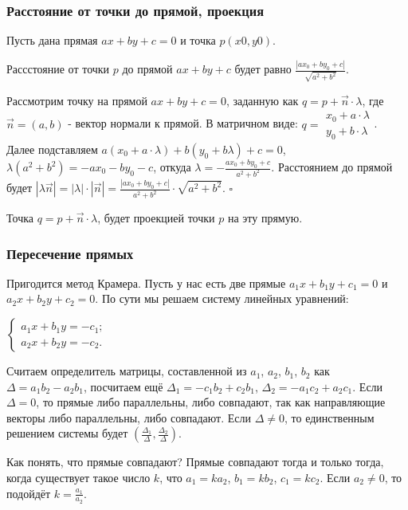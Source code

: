 
\subsubsection*{Расстояние от точки до прямой, проекция}

Пусть дана прямая $ax + by + c = 0$ и точка $p (x0, y0)$.

\Statement Рассстояние от точки $p$ до прямой $ax + by + c$ будет равно $\frac{|ax_0 + by_0 + c|}{\sqrt{a^2 + b^2}}$.

\Proof Рассмотрим точку на прямой $ax + by + c = 0$, заданную как $q = p + \vec{n} \cdot \lambda$, где $\vec{n} = (a, b)$ - вектор нормали к прямой.  В матричном виде: $q = \begin{matrix} x_0 + a \cdot \lambda \\ y_0 + b \cdot \lambda \end{matrix}$. Далее подставляем $a (x_0 + a \cdot \lambda) + b (y_0 + b \lambda) + c = 0$, $\lambda (a^2 + b^2) = -ax_0 - by_0 - c$, откуда $\lambda = - \frac{ax_0 + by_0 + c}{a^2 + b^2}$. Расстоянием до прямой будет $|\lambda \vec{n}| = |\lambda| \cdot |\vec{n}| = \frac{|ax_0 + by_0 + c|}{a^2 + b^2} \cdot \sqrt{a^2 + b^2}$. $\square$

Точка $q = p + \vec{n} \cdot \lambda$, будет проекцией точки $p$ на эту прямую.

\subsubsection*{Пересечение прямых}

Пригодится метод Крамера. Пусть у нас есть две прямые $a_1 x + b_1 y + c_1 = 0$ и $a_2 x + b_2 y + c_2 = 0$. По сути мы решаем систему линейных уравнений:

\begin{center}
    $\begin{cases}
    a_1 x + b_1 y = -c_1; \\
    a_2 x + b_2 y = -c_2.
    \end{cases}$
\end{center}

Считаем определитель матрицы, составленной из $a_1$, $a_2$, $b_1$, $b_2$ как $\Delta = a_1 b_2 - a_2 b_1$, посчитаем ещё $\Delta_1 = -c_1 b_2 + c_2 b_1$, $\Delta_2 = -a_1 c_2 + a_2 c_1$. Если $\Delta = 0$, то прямые либо параллельны, либо совпадают, так как направляющие векторы либо параллельны, либо совпадают. Если $\Delta \neq 0$, то единственным решением системы будет $(\frac{\Delta_1}{\Delta}, \frac{\Delta_2}{\Delta})$.

Как понять, что прямые совпадают? Прямые совпадают тогда и только тогда, когда существует такое число $k$, что $a_1 = k a_2$, $b_1 = k b_2$, $c_1 = k c_2$. Если $a_2 \neq 0$, то подойдёт $k = \frac{a_1}{a_2}$.
